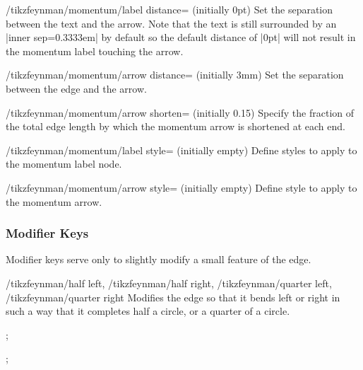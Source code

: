 \documentclass[a4paper,final]{ltxdoc}
\begin{document}
\begin{keylist}
\begin{key}{/tikzfeynman/momentum/label distance= (initially 0pt)}
  Set the separation between the text and the arrow.  Note that the text is
  still surrounded by an |inner sep=0.3333em| by default so the default
  distance of |0pt| will not result in the momentum label touching the arrow.
\end{key}

\begin{key}{/tikzfeynman/momentum/arrow distance= (initially 3mm)}
  Set the separation between the edge and the arrow.
\end{key}

\begin{key}{/tikzfeynman/momentum/arrow shorten= (initially 0.15)}
  Specify the fraction of the total edge length by which the momentum arrow is
  shortened at each end.
\end{key}

\begin{key}{/tikzfeynman/momentum/label style= (initially \normalfont empty)}
  Define styles to apply to the momentum label node.
\end{key}

\begin{key}{/tikzfeynman/momentum/arrow style= (initially \normalfont empty)}
  Define style to apply to the momentum arrow.
\end{key}
\end{keylist}

\subsubsection{Modifier Keys}
\label{subsubsec:modifier_keys}

Modifier keys serve only to slightly modify a small feature of the edge.

\begin{keylist}{%
    /tikzfeynman/half left,
    /tikzfeynman/half right,
    /tikzfeynman/quarter left,
    /tikzfeynman/quarter right}
  Modifies the edge so that it bends left or right in such a way that it
  completes half a circle, or a quarter of a circle.

\begin{codeexample}[]
;
\end{codeexample}

\begin{codeexample}[]
;
\end{codeexample}
\end{keylist}
\end{document}
